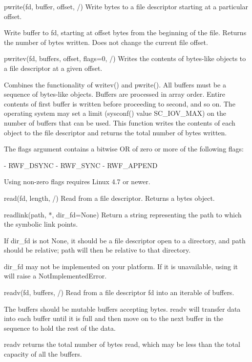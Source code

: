 \documentclass{article}
\begin{document}
    pwrite(fd, buffer, offset, /)
        Write bytes to a file descriptor starting at a particular offset.

        Write buffer to fd, starting at offset bytes from the beginning of
        the file.  Returns the number of bytes written.  Does not change the
        current file offset.

    pwritev(fd, buffers, offset, flags=0, /)
        Writes the contents of bytes-like objects to a file descriptor at a given offset.

        Combines the functionality of writev() and pwrite(). All buffers must be a sequence
        of bytes-like objects. Buffers are processed in array order. Entire contents of first
        buffer is written before proceeding to second, and so on. The operating system may
        set a limit (sysconf() value SC_IOV_MAX) on the number of buffers that can be used.
        This function writes the contents of each object to the file descriptor and returns
        the total number of bytes written.

        The flags argument contains a bitwise OR of zero or more of the following flags:

        - RWF_DSYNC
        - RWF_SYNC
        - RWF_APPEND

        Using non-zero flags requires Linux 4.7 or newer.

    read(fd, length, /)
        Read from a file descriptor.  Returns a bytes object.

    readlink(path, *, dir_fd=None)
        Return a string representing the path to which the symbolic link points.

        If dir_fd is not None, it should be a file descriptor open to a directory,
        and path should be relative; path will then be relative to that directory.

        dir_fd may not be implemented on your platform.  If it is unavailable,
        using it will raise a NotImplementedError.

    readv(fd, buffers, /)
        Read from a file descriptor fd into an iterable of buffers.

        The buffers should be mutable buffers accepting bytes.
        readv will transfer data into each buffer until it is full
        and then move on to the next buffer in the sequence to hold
        the rest of the data.

        readv returns the total number of bytes read,
        which may be less than the total capacity of all the buffers.
\end{document}
